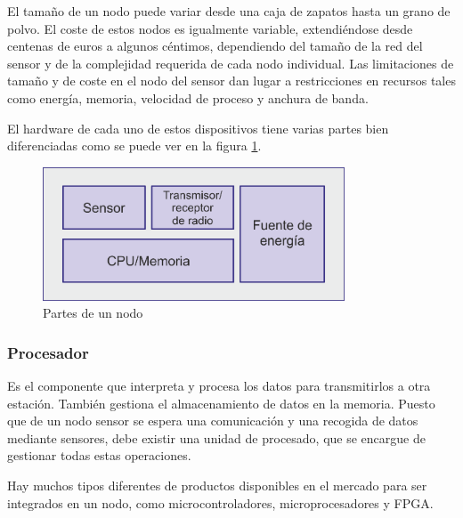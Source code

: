 El tama\~no de un nodo puede variar desde una caja de zapatos hasta un grano de polvo. El coste de estos nodos es igualmente variable, extendi\'endose desde centenas de euros a algunos c\'entimos, dependiendo del tama\~no de la red del sensor y de la complejidad requerida de cada nodo individual. Las limitaciones de tama\~no y de coste en el nodo del sensor dan lugar a restricciones en recursos tales como energ\'ia, memoria, velocidad de proceso y anchura de banda.

El hardware de cada uno de estos dispositivos tiene varias partes bien diferenciadas como se puede ver en la figura \ref{fig:partes_nodo}.

\begin{figure}[htbp]
	\centering
		\includegraphics[width=0.8\textwidth]{imagenes/partes_nodo.png}
	\caption{Partes de un nodo}
	\label{fig:partes_nodo}
\end{figure}

 


\subsubsection{Procesador}
Es el componente que interpreta y procesa los datos para transmitirlos a otra estaci\'on. Tambi\'en gestiona el
almacenamiento de datos en la memoria. Puesto que de un nodo sensor se espera una comunicaci\'on y una recogida de datos mediante sensores, debe existir una unidad de procesado, que se encargue de gestionar todas estas operaciones. 

Hay muchos tipos diferentes de productos disponibles en el mercado para ser integrados en un nodo, como
microcontroladores, microprocesadores y FPGA. 

